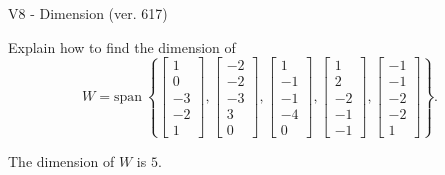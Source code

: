 \begin{exercise}
  \begin{exerciseTitle}V8 - Dimension (ver. 617)\end{exerciseTitle}
  \begin{exerciseStatement}
    Explain how to find the dimension of 
\[W=\mathrm{span}\ \left\{\left[\begin{array}{r}
1 \\
0 \\
-3 \\
-2 \\
1
\end{array}\right] , \left[\begin{array}{r}
-2 \\
-2 \\
-3 \\
3 \\
0
\end{array}\right] , \left[\begin{array}{r}
1 \\
-1 \\
-1 \\
-4 \\
0
\end{array}\right] , \left[\begin{array}{r}
1 \\
2 \\
-2 \\
-1 \\
-1
\end{array}\right] , \left[\begin{array}{r}
-1 \\
-1 \\
-2 \\
-2 \\
1
\end{array}\right]\right\}.\]



  \end{exerciseStatement}
  \begin{exerciseAnswer}
   The dimension of \(W\) is  \(5\).
  


  \end{exerciseAnswer}
\end{exercise}